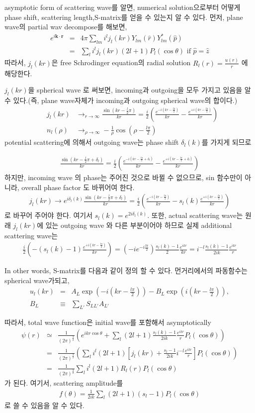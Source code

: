 \documentclass[10pt]{article}
\def\bm{\boldsymbol}
\newcommand{\bea}{\begin{eqnarray}}
\newcommand{\eea}{\end{eqnarray}}
\newcommand{\no}{\nonumber \\}
\def\vk{{\bm k}}
\def\vr{{\bm r}}
\begin{document}
asymptotic form of scattering wave를 알면, numerical solution으로부터
어떻게 phase shift, scattering length,S-matrix를 얻을 수 있는지 알 수 있다.
먼저, plane wave의 partial wav decompose를 해보면,
\bea
e^{i\vk\cdot\vr}
&=&4\pi \sum_{lm} i^l j_{l}(kr) Y_{lm}(\hat{r})Y^{*}_{lm}(\hat{p}) \no
&=& \sum_{l} i^l j_{l}(kr)(2l+1) P_l(\cos\theta)\mbox{ if $\hat{p}=\hat{z}$}
\eea
따라서, $j_l(kr)$은 free Schrodinger equation의 radial solution
$R_l(r)=\frac{u(r)}{r}$ 에 해당한다.

$j_l(kr)$을 spherical wave 로 써보면, incoming과 outgoing을 모두 가지고 있음을 알 수 있다.(즉, plane wave자체가 incoming과 outgoing spherical wave의 합이다.)
\bea
&j_{l}(kr)&\to_{r\to \infty} \frac{\sin(kr-\frac{l}{2}\pi)}{kr}
            =\frac{i}{2}\left(\frac{e^{-i(kr-\frac{l\pi}{2})}}{kr}            
             -\frac{e^{+i(kr-\frac{l\pi}{2})}}{kr}\right) \no
&n_{l}(\rho)&\to_{\rho\to\infty} -\frac{1}{\rho}\cos(\rho-\frac{l\pi}{2})               
\eea
potential scattering에 의해서 outgoing wave는 phase shift $\delta_l(k)$를
가지게 되므로

\bea
\frac{\sin(kr-\frac{l}{2}\pi+\delta_l)}{kr}
            =\frac{i}{2}\left(\frac{e^{-i(kr-\frac{l\pi}{2}+\delta_l)}}{kr}            
             -\frac{e^{+i(kr-\frac{l\pi}{2}+\delta_l)}}{kr}\right)
\eea
하지만, incoming wave 의 phase는 주어진 것으로 바뀔 수 없으므로,
sin 함수만이 아니라, overall phase factor 도 바뀌어여 한다.
\bea
j_{l}(kr)\to 
e^{i\delta_l(k)}\frac{\sin(kr-\frac{l}{2}\pi+\delta_l)}{kr}
=\frac{i}{2}\left(\frac{e^{-i(kr-\frac{l\pi}{2})}}{kr}            
             -s_{l}(k)\frac{e^{+i(kr-\frac{l\pi}{2})}}{kr}\right)
\eea
로 바꾸어 주어야 한다. 여기서 $s_{l}(k)=e^{2i\delta_l(k)}$.
또한, actual scattering wave는 원래 $j_l(kr)$에 있는 outgoing wave
와 다른 부분이어야 하므로 실제 additional scattering wave는 
\bea
\frac{i}{2}\left(            
-(s_{l}(k)-1)\frac{e^{+i(kr-\frac{l\pi}{2})}}{kr}\right)
=(-ie^{-i\frac{l\pi}{2}})\frac{s_l(k)-1}{2}\frac{e^{ikr}}{kr}
=i^{-l}\frac{s_l(k)-1}{2 i k}\frac{e^{ikr}}{r}
\eea

In other words, S-matrix를 다음과 같이 정의 할 수 있다.
먼거리에서의 파동함수는 spherical wave가되고,
\bea 
u_{l}(kr)&=&A_L \exp(-i(kr-\frac{l\pi}{2}))
           -B_L \exp(i(kr-\frac{l\pi}{2})),\no
B_L&\equiv &\sum_{L'}S_{LL'}A_{L'}             
\eea 

따라서, total wave function은 initial wave를 포함해서
asymptotically
\bea
\psi(r)&\simeq&
\frac{1}{(2\pi)^{\frac{3}{2}}}\left(
e^{ikr\cos\theta}
       +\sum_{l}(2l+1)
       \frac{s_l(k)-1}{2 i k}\frac{e^{ikr}}{r} P_l(\cos\theta)
       \right)\no
       &=&\frac{1}{(2\pi)^{\frac{3}{2}}}\left(\sum_l i^l (2l+1)
       [j_l(kr)+\frac{s_l-1}{2ik}i^{-l}\frac{e^{ikr}}{r}]
       P_l(\cos\theta)\right)\no
       &=&\frac{1}{(2\pi)^{\frac{3}{2}}}
       \sum_l i^l (2l+1)R_l(r)P_l(\cos\theta)      
\eea
가 된다. 여기서, scattering amplitude를 
\bea
f(\theta)=\frac{1}{2ik}\sum_l (2l+1)(s_l-1)P_l(\cos\theta)
\eea
로 쓸 수 있음을 알 수 있다. 
\end{document}
